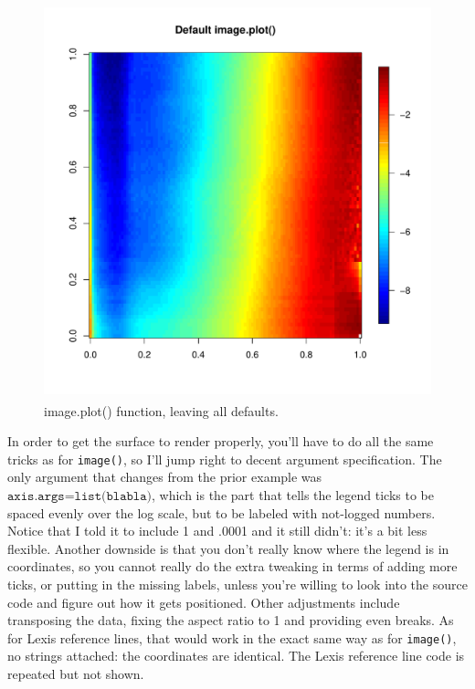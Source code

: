 \documentclass[a4paper]{article}
\begin{document}
\begin{figure}
\centering
\includegraphics[width=4.5in,height=4.5in]{figs/imageplot1.pdf}
\caption{image.plot() function, leaving all defaults.}
\end{figure}

In order to get the surface to render properly, you'll have to do all the same tricks as for \texttt{image()}, so I'll jump right to decent argument specification. The only argument that changes from the prior example was $\texttt{axis.args=list(blabla)}$, which is the part that tells the legend ticks to be spaced evenly over the log scale, but to be labeled with not-logged numbers. Notice that I told it to include 1 and .0001 and it still didn't: it's a bit less flexible. Another downside is that you don't really know where the legend is in coordinates, so you cannot really do the extra tweaking in terms of adding more ticks, or putting in the missing labels, unless you're willing to look into the source code and figure out how it gets positioned. Other adjustments include transposing the data, fixing the aspect ratio to 1 and providing even breaks. As for Lexis reference lines, that would work in the exact same way as for \texttt{image()}, no strings attached: the coordinates are identical. The Lexis reference line code is repeated but not shown.
\end{document}
